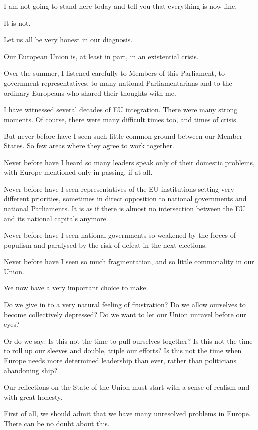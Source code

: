 \documentclass[a4paper,11pt]{article}
\begin{document}
I am not going to stand here today and tell you that everything is now fine.

It is not.

Let us all be very honest in our diagnosis.

Our European Union is, at least in part, in an existential crisis.

Over the summer, I listened carefully to Members of this Parliament, to government representatives, to many national Parliamentarians and to the ordinary Europeans who shared their thoughts with me.

I have witnessed several decades of EU integration. There were many strong moments. Of course, there were many difficult times too, and times of crisis.

But never before have I seen such little common ground between our Member States. So few areas where they agree to work together.

Never before have I heard so many leaders speak only of their domestic problems, with Europe mentioned only in passing, if at all.

Never before have I seen representatives of the EU institutions setting very different priorities, sometimes in direct opposition to national governments and national Parliaments. It is as if there is almost no intersection between the EU and its national capitals anymore.

Never before have I seen national governments so weakened by the forces of populism and paralysed by the risk of defeat in the next elections.

Never before have I seen so much fragmentation, and so little commonality in our Union.

We now have a very important choice to make.

Do we give in to a very natural feeling of frustration? Do we allow ourselves to become collectively depressed? Do we want to let our Union unravel before our eyes?

Or do we say: Is this not the time to pull ourselves together? Is this not the time to roll up our sleeves and double, triple our efforts? Is this not the time when Europe needs more determined leadership than ever, rather than politicians abandoning ship?

Our reflections on the State of the Union must start with a sense of realism and with great honesty.

First of all, we should admit that we have many unresolved problems in Europe. There can be no doubt about this.
\end{document}
